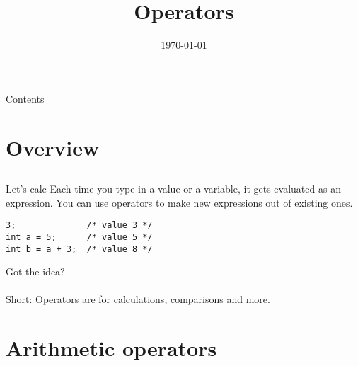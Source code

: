 
\newcommand{\topic}{
	Operators
}

\title{\topic}
\supertitle{\course}
\date{\today}



\maketitle

\begin{frame}{Contents}
	\tableofcontents
\end{frame}

\section{Overview}
\subsection{}
\begin{frame}[fragile]{Let's calc}
	Each time you type in a value or a variable, it gets evaluated as an expression. You can use operators to make new expressions out of existing ones.
	\begin{lstlisting}[numbers=none]
3;				/* value 3 */
int a = 5; 		/* value 5 */
int b = a + 3;	/* value 8 */
\end{lstlisting}
Got the idea?\\
\ \\Short: Operators are for calculations, comparisons and more.
\end{frame}
\section{Arithmetic operators}
